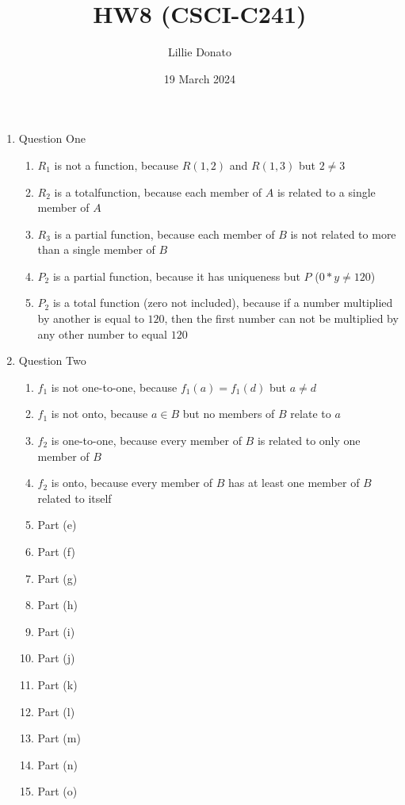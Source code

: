 \documentclass{article}
\title{HW8 (CSCI-C241)}
\author{Lillie Donato}
\date{19 March 2024}
\begin{document}
\maketitle

\begin{enumerate}
    \item Question One
    \begin{enumerate}
        \item $R_1$ is not a function, because $R(1, 2)$ and $R(1, 3)$ but $2 \neq 3$
        \item $R_2$ is a totalfunction, because each member of $A$ is related to a single member of $A$
        \item $R_3$ is a partial function, because each member of $B$ is not related to more than a single member of $B$
        \item $P_2$ is a partial function, because it has uniqueness but $P$ ($0*y \neq 120$)
        \item $P_2$ is a total function (zero not included), because if a number multiplied by another is equal to $120$, then the first number can not be multiplied by any other number to equal $120$
    \end{enumerate}
    \item Question Two
    \begin{enumerate}
        \item $f_1$ is not one-to-one, because $f_1(a) = f_1(d)$ but $a \neq d$
        \item $f_1$ is not onto, because $a \in B$ but no members of $B$ relate to $a$
        \item $f_2$ is one-to-one, because every member of $B$ is related to only one member of $B$
        \item $f_2$ is onto, because every member of $B$ has at least one member of $B$ related to itself
        \item Part (e)
        \item Part (f)
        \item Part (g)
        \item Part (h)
        \item Part (i)
        \item Part (j)
        \item Part (k)
        \item Part (l)
        \item Part (m)
        \item Part (n)
        \item Part (o)

\end{enumerate}
\end{enumerate}
\end{document}
